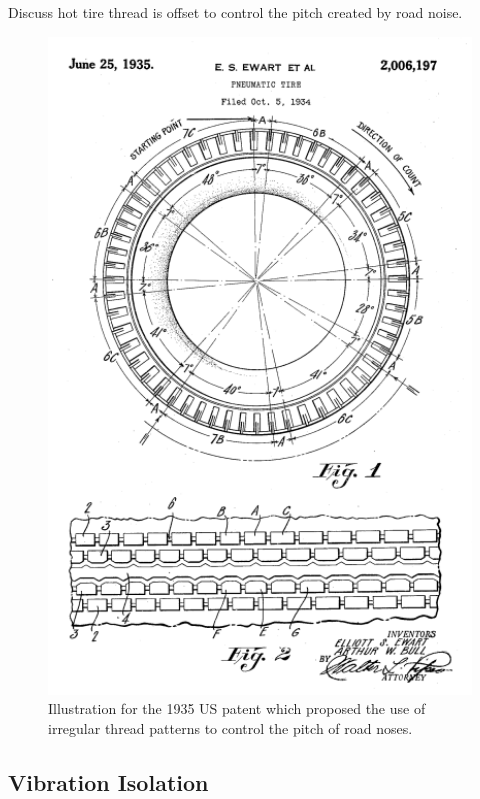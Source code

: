 \documentclass[12pt,letter]{article}
\begin{document}
		\begin{vibration_case_study}
	Discuss hot tire thread is offset to control the pitch created by road noise.
	\begin{figure}[H]
		\centering
		\includegraphics[width=4.5in]{../figures/tire_tred_patent.png}
		\caption{Illustration for the 1935 US patent which proposed the use of irregular thread patterns to control the pitch of road noses\protect\footnotemark[1].}
	\end{figure}	
\end{vibration_case_study}







\subsection{Vibration Isolation}
\end{document}

